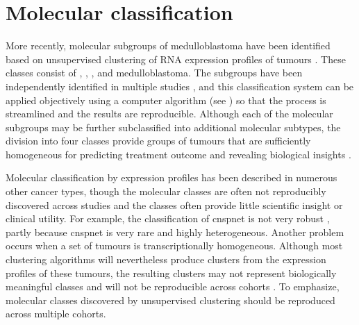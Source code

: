

\section{Molecular classification}

More recently, molecular subgroups of medulloblastoma have been identified based on unsupervised clustering of RNA expression profiles of tumours . These classes consist of , , , and  medulloblastoma. The subgroups have been independently identified in multiple studies , and this classification system can be applied objectively using a computer algorithm (see ) so that the process is streamlined and the results are reproducible. Although each of the molecular subgroups may be further subclassified into additional molecular subtypes, the division into four classes provide groups of tumours that are sufficiently homogeneous for predicting treatment outcome and revealing biological insights .

Molecular classification by expression profiles has been described in numerous other cancer types, though the molecular classes are often not reproducibly discovered across studies and the classes often provide little scientific insight or clinical utility. For example, the classification of \gls{cnspnet} is not very robust , partly because \gls{cnspnet} is very rare and highly heterogeneous. Another problem occurs when a set of tumours is transcriptionally homogeneous. Although most clustering algorithms will nevertheless produce clusters from the expression profiles of these tumours, the resulting clusters may not represent biologically meaningful classes and will not be reproducible across cohorts . To emphasize, molecular classes discovered by unsupervised clustering should be reproduced across multiple cohorts.

